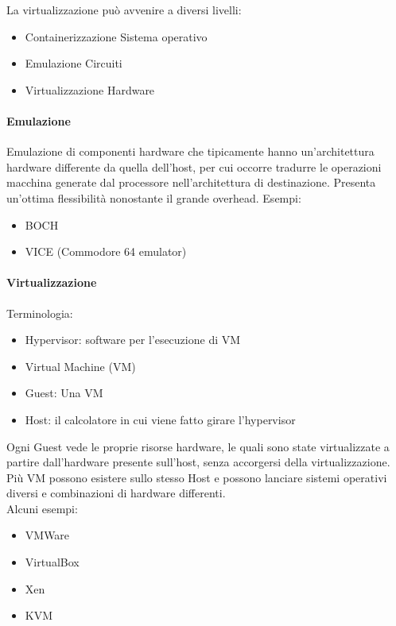 \documentclass{article}
\begin{document}
		La virtualizzazione può avvenire a diversi livelli:
		\begin{itemize}
		    \item Containerizzazione \textrightarrow  Sistema operativo
		    \item Emulazione \textrightarrow  Circuiti
		    \item Virtualizzazione \textrightarrow  Hardware
		\end{itemize}
		
		\paragraph{Emulazione}
		Emulazione di componenti hardware che tipicamente hanno un'architettura hardware differente da quella dell'host, per cui occorre tradurre le operazioni macchina generate dal processore nell'architettura di destinazione. Presenta un'ottima flessibilità nonostante il grande overhead.\newline
		Esempi:
		\begin{itemize}
		    \item  BOCH
		    \item  VICE (Commodore 64 emulator)
		\end{itemize}
		
		\paragraph{Virtualizzazione}
		Terminologia:
		\begin{itemize}
		    \item Hypervisor: software per l'esecuzione di VM
		    \item Virtual Machine (VM) 
		    \item Guest: Una VM
		    \item Host: il calcolatore in cui viene fatto girare l'hypervisor
		\end{itemize}
		Ogni Guest vede le proprie risorse hardware, le quali sono state virtualizzate a partire dall'hardware presente sull'host, senza accorgersi della virtualizzazione. Più VM possono esistere sullo stesso Host e possono lanciare sistemi operativi diversi e combinazioni di hardware differenti.\\
		Alcuni esempi:
		\begin{itemize}
		    \item VMWare
		    \item VirtualBox
		    \item Xen
		    \item KVM
		\end{itemize}
		
\end{document}
